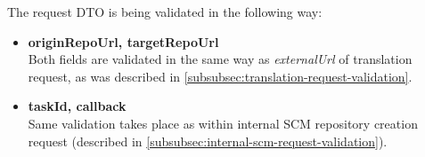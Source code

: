\documentclass[../main.tex]{subfiles}
\begin{document}
The request DTO is being validated in the following way:
\begin{itemize}
    \item \textbf{originRepoUrl, targetRepoUrl}\\
    Both fields are validated in the same way as \textit{externalUrl} of translation request, as was described in \ref{subsubsec:translation-request-validation}.

    \item \textbf{taskId, callback}\\
    Same validation takes place as within internal SCM repository creation request (described in \ref{subsubsec:internal-scm-request-validation}).
\end{itemize}
\end{document}
